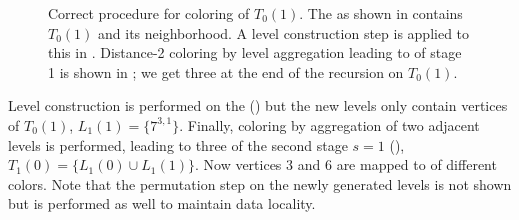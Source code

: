 \begin{figure}[t]
     	\centering
     	\hspace{0.6em}
     	\hspace{0.6em}
     	\hspace{0.6em}
     	\hspace{0.6em}
     	\caption{Correct procedure for \DTWO coloring of \levelGroup $T_0(1)$. The \subgraph as shown in  contains \levelGroup $T_0(1)$ and its \DONE neighborhood. A level construction step is applied to this \subgraph in . Distance-2 coloring by level aggregation leading to \levelGroups of stage 1 is shown in ; we get three \levelGroups at the end of the recursion on $T_0(1)$.}
     	\label{fig:rec_d2_correct}
     \end{figure}
Level construction is performed on the \subgraph () but the new levels only contain vertices of  $T_0(1)$, \ie $L_1(1) = \{7^{3,1}\}$. Finally, \DTWO coloring by aggregation of two adjacent levels is performed, leading to three \levelGroups of the second stage $s=1$ (), \ie $T_1(0)=\{L_1(0) \cup L_1(1)\}$.  Now vertices $3$ and $6$ are mapped to \levelGroups of different colors. Note that the permutation step on the newly generated levels is not shown but is performed as well to maintain data locality. 
    
